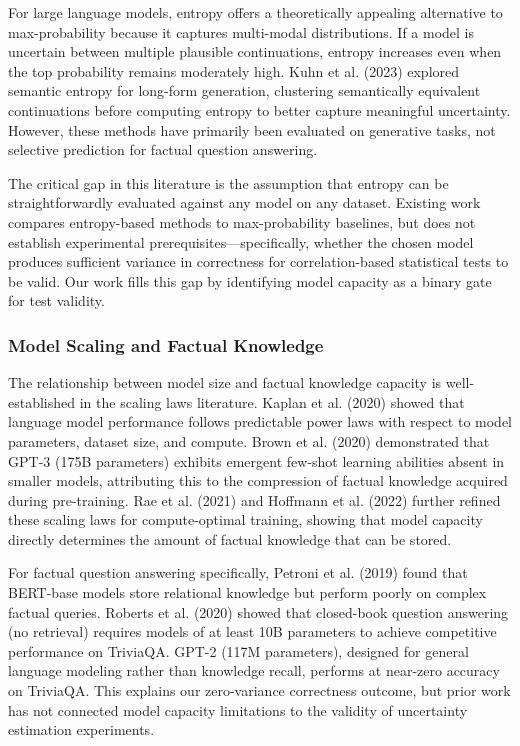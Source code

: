 For large language models, entropy offers a theoretically appealing alternative to max-probability because it captures multi-modal distributions. If a model is uncertain between multiple plausible continuations, entropy increases even when the top probability remains moderately high. Kuhn et al. (2023) explored semantic entropy for long-form generation, clustering semantically equivalent continuations before computing entropy to better capture meaningful uncertainty. However, these methods have primarily been evaluated on generative tasks, not selective prediction for factual question answering.

The critical gap in this literature is the assumption that entropy can be straightforwardly evaluated against any model on any dataset. Existing work compares entropy-based methods to max-probability baselines, but does not establish experimental prerequisites---specifically, whether the chosen model produces sufficient variance in correctness for correlation-based statistical tests to be valid. Our work fills this gap by identifying model capacity as a binary gate for test validity.

\subsubsection{Model Scaling and Factual Knowledge}

The relationship between model size and factual knowledge capacity is well-established in the scaling laws literature. Kaplan et al. (2020) showed that language model performance follows predictable power laws with respect to model parameters, dataset size, and compute. Brown et al. (2020) demonstrated that GPT-3 (175B parameters) exhibits emergent few-shot learning abilities absent in smaller models, attributing this to the compression of factual knowledge acquired during pre-training. Rae et al. (2021) and Hoffmann et al. (2022) further refined these scaling laws for compute-optimal training, showing that model capacity directly determines the amount of factual knowledge that can be stored.

For factual question answering specifically, Petroni et al. (2019) found that BERT-base models store relational knowledge but perform poorly on complex factual queries. Roberts et al. (2020) showed that closed-book question answering (no retrieval) requires models of at least 10B parameters to achieve competitive performance on TriviaQA. GPT-2 (117M parameters), designed for general language modeling rather than knowledge recall, performs at near-zero accuracy on TriviaQA. This explains our zero-variance correctness outcome, but prior work has not connected model capacity limitations to the validity of uncertainty estimation experiments.

